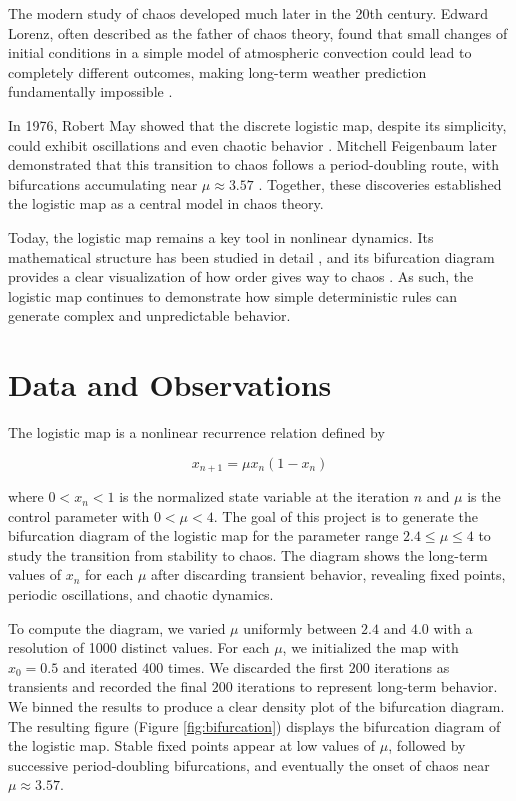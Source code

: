 \documentclass[linenumbers, RNAAS, trackchanges]{aastex631}
\begin{document}
The modern study of chaos developed much later in the 20th century.
Edward Lorenz, often described as the father of chaos theory, found that
small changes of initial conditions in a simple model of atmospheric convection
could lead to completely different outcomes, making long-term weather
prediction fundamentally impossible \cite{boeing}.

In 1976, Robert May showed that the discrete logistic map, despite its
simplicity, could exhibit oscillations and even chaotic behavior \cite{may}.
Mitchell Feigenbaum later demonstrated that this transition to chaos follows
a period-doubling route, with bifurcations accumulating near $\mu\approx 3.57$
\cite{feig}. Together, these discoveries established the
logistic map as a central model in chaos theory.

Today, the logistic map remains a key tool in nonlinear dynamics.
Its mathematical structure has been studied in detail \cite{bubolo}, and its
bifurcation diagram provides a clear visualization of how order gives way to
chaos \cite{boeing}. As such, the logistic map continues to demonstrate how
simple deterministic rules can generate complex and unpredictable behavior.


\section{Data and Observations} \label{sec:data}

The logistic map is a nonlinear recurrence relation defined by

\begin{equation}
    x_{n+1}=\mu x_n(1-x_n)
\end{equation}

where $0<x_n<1$ is the normalized state variable at the iteration $n$ and $\mu$
is the control parameter with $0<\mu<4$. The goal of this project is to
generate the bifurcation diagram of the logistic map for the parameter range
$2.4\leq\mu\leq4$ to study the transition from stability to chaos. The diagram
shows the long-term values of $x_n$ for each $\mu$ after discarding transient
behavior, revealing fixed points, periodic oscillations, and chaotic dynamics.

To compute the diagram, we varied $\mu$ uniformly between $2.4$ and $4.0$ with
a resolution of 1000 distinct values. For each $\mu$, we initialized the map
with $x_0=0.5$ and iterated $400$ times. We discarded the first $200$
iterations as transients and recorded the final $200$ iterations to represent
long-term behavior. We binned the results to produce a clear density plot of the
bifurcation diagram. The resulting figure (Figure \ref{fig:bifurcation})
displays the bifurcation diagram of the logistic map. Stable fixed points
appear at low values of $\mu$, followed by successive period-doubling
bifurcations, and eventually the onset of chaos near $\mu\approx3.57$.
\end{document}
